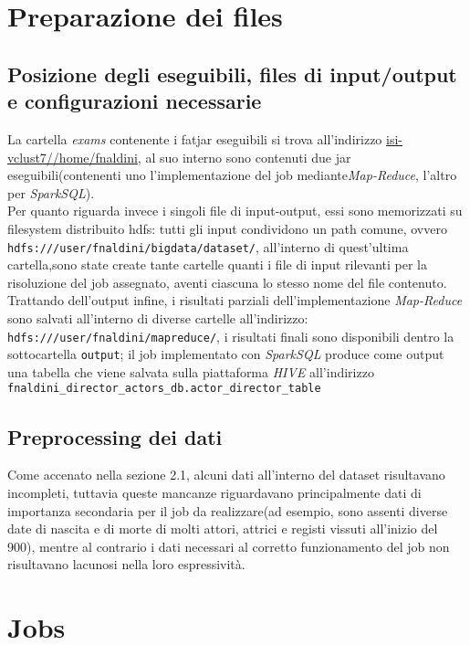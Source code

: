 \documentclass[hidelinks]{article}
\begin{document}
\section{Preparazione dei files}

\subsection{Posizione degli eseguibili, files di input/output e configurazioni necessarie}
La cartella \textit{exams} contenente i fatjar eseguibili si trova all'indirizzo \url{isi-vclust7//home/fnaldini}, al suo interno sono contenuti due jar eseguibili(contenenti uno l'implementazione del job mediante\textit{Map-Reduce}, l'altro per \textit{SparkSQL}).\\
Per quanto riguarda invece i singoli file di input-output, essi sono memorizzati su filesystem distribuito hdfs: tutti gli input condividono un path comune, ovvero \texttt{hdfs:///user/fnaldini/bigdata/dataset/}, all'interno di quest'ultima cartella,sono state create tante cartelle quanti i file di input rilevanti per la risoluzione del job assegnato, aventi ciascuna lo stesso nome del file contenuto.\\
Trattando dell'output infine, i risultati parziali dell'implementazione \textit{Map-Reduce}  sono salvati all'interno di diverse cartelle all'indirizzo: \texttt{hdfs:///user/fnaldini/mapreduce/}, i risultati finali sono disponibili dentro la sottocartella \texttt{output}; il job implementato con \textit{SparkSQL} produce come output una tabella che viene salvata sulla piattaforma \textit{HIVE} all'indirizzo \texttt{fnaldini\_director\_actors\_db.actor\_director\_table}

\subsection{Preprocessing dei dati}
Come accenato nella sezione 2.1, alcuni dati all'interno del dataset risultavano incompleti, tuttavia queste mancanze riguardavano principalmente dati di importanza secondaria per il job da realizzare(ad esempio, sono assenti diverse date di nascita e di morte di molti attori, attrici e registi vissuti all'inizio del 900), mentre al contrario i dati necessari al corretto funzionamento del job non risultavano lacunosi nella loro espressività.



\section{Jobs}
\end{document}
